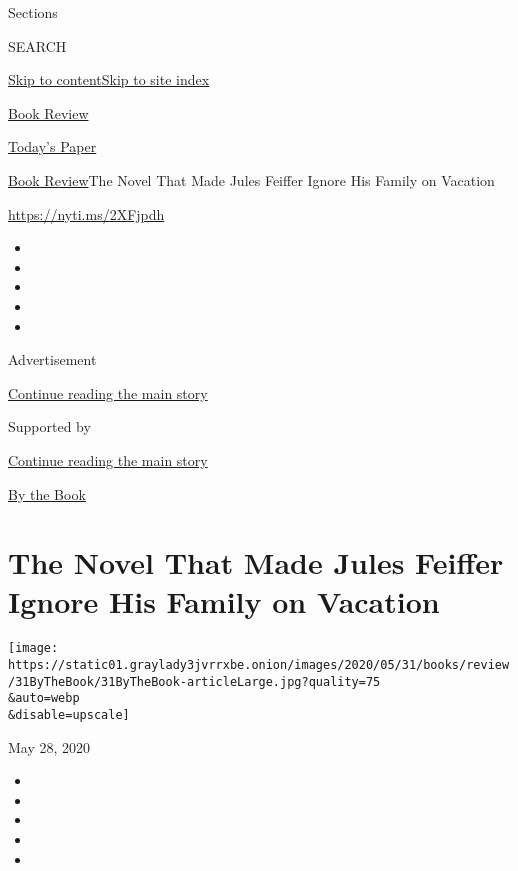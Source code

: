 Sections

SEARCH

\protect\hyperlink{site-content}{Skip to
content}\protect\hyperlink{site-index}{Skip to site index}

\href{https://www.nytimes3xbfgragh.onion/section/books/review}{Book
Review}

\href{https://myaccount.nytimes3xbfgragh.onion/auth/login?response_type=cookie\&client_id=vi}{}

\href{https://www.nytimes3xbfgragh.onion/section/todayspaper}{Today's
Paper}

\href{/section/books/review}{Book Review}\textbar{}The Novel That Made
Jules Feiffer Ignore His Family on Vacation

\url{https://nyti.ms/2XFjpdh}

\begin{itemize}
\item
\item
\item
\item
\item
\end{itemize}

Advertisement

\protect\hyperlink{after-top}{Continue reading the main story}

Supported by

\protect\hyperlink{after-sponsor}{Continue reading the main story}

\href{/column/by-the-book}{By the Book}

\hypertarget{the-novel-that-made-jules-feiffer-ignore-his-family-on-vacation}{%
\section{The Novel That Made Jules Feiffer Ignore His Family on
Vacation}\label{the-novel-that-made-jules-feiffer-ignore-his-family-on-vacation}}

\texttt{[image: https://static01.graylady3jvrrxbe.onion/images/2020/05/31/books/review/31ByTheBook/31ByTheBook-articleLarge.jpg?quality=75\\\&auto=webp\\\&disable=upscale]}

May 28, 2020

\begin{itemize}
\item
\item
\item
\item
\item
\end{itemize}

